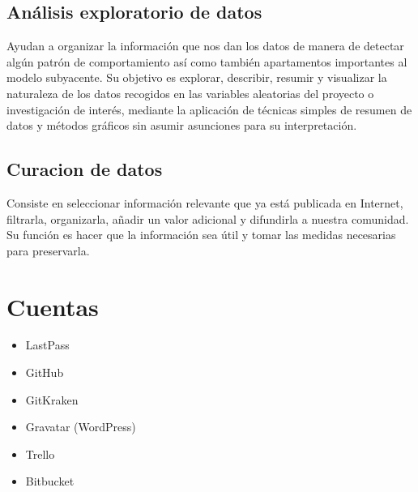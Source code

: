 \documentclass[12pt,letterpaper]{article}
\begin{document}
\subsection*{An\'alisis exploratorio de datos}
Ayudan a organizar la informaci\'on que nos dan los datos de manera de detectar alg\'un patr\'on de comportamiento as\'i como tambi\'en apartamentos importantes al modelo subyacente.
\citep{OreAnaliExplo}
Su objetivo es explorar, describir, resumir y visualizar la naturaleza de los datos recogidos en las variables aleatorias del proyecto o investigaci\'on de inter\'es, mediante la aplicaci\'on de t\'ecnicas simples de resumen de datos y m\'etodos gr\'aficos sin asumir asunciones para su interpretaci\'on.
\citep{HelAnaliExplo}

\subsection*{Curacion de datos}
Consiste en seleccionar informaci\'on relevante que ya est\'a publicada en Internet, filtrarla, organizarla, añadir un valor adicional y difundirla a nuestra comunidad.
\citep{DuroCur}
Su funci\'on es hacer que la informaci\'on sea \'util y tomar las medidas necesarias para preservarla.
\citep{ItCur}

\section{Cuentas}
\begin{itemize}
\item LastPass
\item GitHub
\item GitKraken
\item Gravatar (WordPress)
\item Trello
\item Bitbucket
\end{itemize}

 

\end{document}
